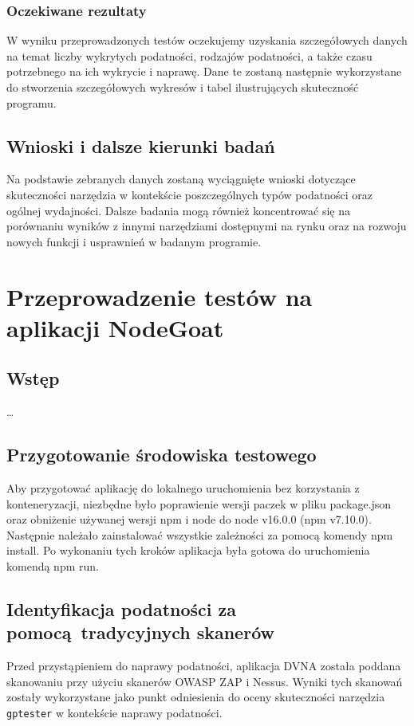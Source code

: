 \subsection{Oczekiwane rezultaty}
W wyniku przeprowadzonych testów oczekujemy uzyskania szczegółowych danych na temat liczby wykrytych podatności, rodzajów podatności, a także czasu potrzebnego na ich wykrycie i naprawę. Dane te zostaną następnie wykorzystane do stworzenia szczegółowych wykresów i tabel ilustrujących skuteczność programu.

\section{Wnioski i dalsze kierunki badań}
Na podstawie zebranych danych zostaną wyciągnięte wnioski dotyczące skuteczności narzędzia w kontekście poszczególnych typów podatności oraz ogólnej wydajności. Dalsze badania mogą również koncentrować się na porównaniu wyników z innymi narzędziami dostępnymi na rynku oraz na rozwoju nowych funkcji i usprawnień w badanym programie.

\chapter{Przeprowadzenie testów na aplikacji NodeGoat}

\section{Wstęp}
\label{sec:wstep}
\dots

\section{Przygotowanie środowiska testowego}
\label{sec:przygotowanie_srodowiska_testowego}

Aby przygotować aplikację do lokalnego uruchomienia bez korzystania z konteneryzacji, niezbędne było poprawienie wersji paczek w pliku package.json oraz obniżenie używanej wersji npm i node do node v16.0.0 (npm v7.10.0). Następnie należało zainstalować wszystkie zależności za pomocą komendy npm install. Po wykonaniu tych kroków aplikacja była gotowa do uruchomienia komendą npm run.


\section{Identyfikacja podatności za pomocą tradycyjnych skanerów}
Przed przystąpieniem do naprawy podatności, aplikacja DVNA została poddana skanowaniu przy użyciu skanerów OWASP ZAP i Nessus. Wyniki tych skanowań zostały wykorzystane jako punkt odniesienia do oceny skuteczności narzędzia \texttt{gptester} w kontekście naprawy podatności.


